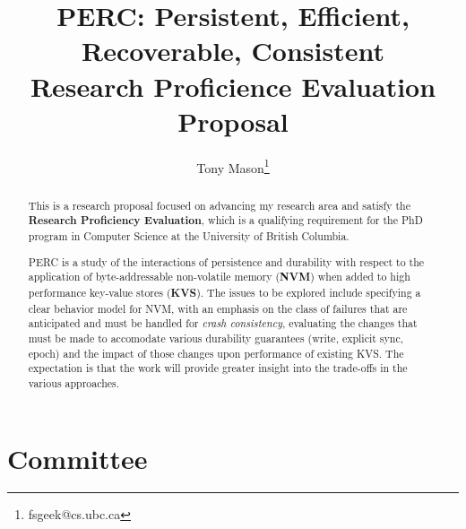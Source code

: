 \documentclass[letterpaper,twocolumn,10pt]{article}
\begin{document}
\title{PERC: Persistent, Efficient, Recoverable, Consistent \\
       Research Proficience Evaluation Proposal
}


\author{Tony Mason\thanks{fsgeek@cs.ubc.ca}}

\date{}

\maketitle

\begin{abstract}
    This is a research proposal focused on advancing my research area and satisfy the \textbf{Research Proficiency Evaluation}, which is a
    qualifying requirement for the PhD program in Computer Science at the University of British Columbia.

    PERC is a study of the interactions of persistence and durability with respect to the application of byte-addressable non-volatile memory
    (\textbf{NVM}) when added to high performance key-value stores (\textbf{KVS}).  The issues to be explored include specifying a clear behavior
    model for NVM, with an emphasis on the class of failures that are anticipated and must be handled for \textit{crash consistency}, evaluating
    the changes that must be made to accomodate various durability guarantees (write, explicit sync, epoch) and the impact of those changes upon
    performance of existing KVS.   The expectation is that the work will provide greater insight into the trade-offs in the various approaches.
\end{abstract}

\section{Committee}
\end{document}
